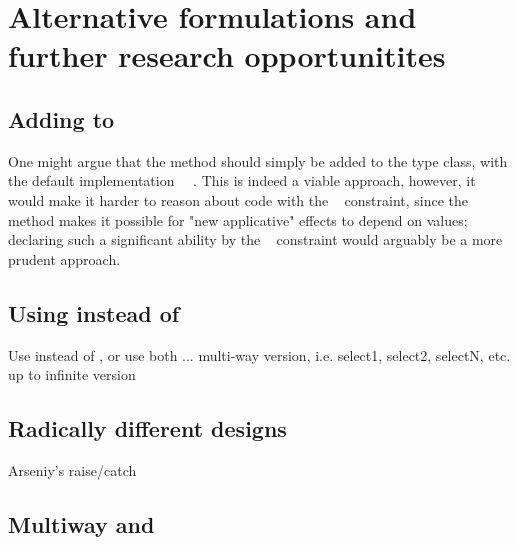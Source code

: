 \section{Alternative formulations and further research opportunitites}
\label{sec-alternatives}

\subsection{Adding  to }\label{sec-alt-applicative}

One might argue that the  method should simply be added to the
 type class, with the default implementation
~\hs{=}~. This is indeed a viable approach, however, it
would make it harder to reason about code with the ~
constraint, since the  method makes it possible for "new applicative"
effects to depend on values; declaring such a significant ability by the
~ constraint would arguably be a more prudent approach.

\subsection{Using  instead of }\label{sec-alt-branch}

Use  instead of , or use both
...
multi-way version, i.e. select1, select2, selectN, etc. up to infinite version

\subsection{Radically different designs}

Arseniy's raise/catch

\subsection{Multiway  and }\label{sec-selectivedo}
